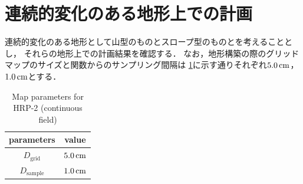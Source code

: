 \documentclass[autodetect-engine,dvipdfmx-if-dvi,ja=standard,a4j,jbase=11pt,magstyle=nomag*]{bxjsreport}
\begin{document}




\section{連続的変化のある地形上での計画}
連続的変化のある地形として山型のものとスロープ型のものとを考えることとし，
それらの地形上での計画結果を確認する．
なお，地形構築の際のグリッドマップのサイズと関数からのサンプリング間隔は
\cref{tab:sim_hrp2_param_map_con}に示す通りそれぞれ$5.0\,\si{\centi\meter}$，$1.0\,\si{\centi\meter}$とする．
\begin{table}[t]%
    \centering
    \caption{Map parameters for HRP-2 (continuous field)}
    \label{tab:sim_hrp2_param_map_con}
    \begin{tabular}{cc}
        \toprule
        parameters              &   value \\
        \midrule
        $D_\mathrm{grid}$       &   $5.0\,\si{\centi\meter}$ \\
        $D_\mathrm{sample}$     &   $1.0\,\si{\centi\meter}$ \\
        \bottomrule
    \end{tabular}
\end{table}
\end{document}
